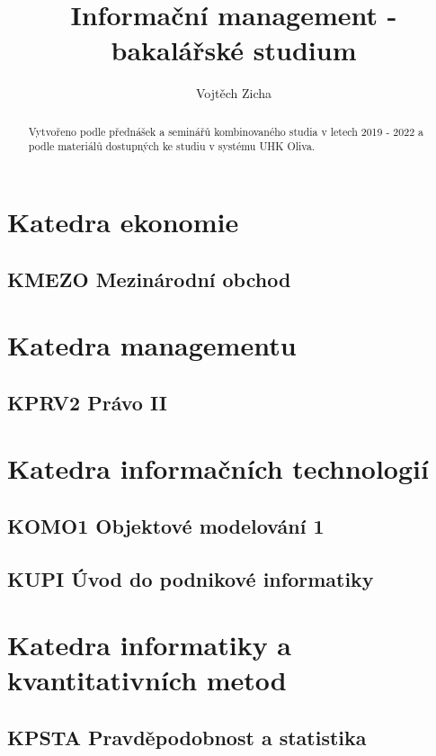 \documentclass[twoside,12pt]{report}
\title{Informační management - bakalářské studium}
\author{Vojtěch Zicha}
\begin{document}
\maketitle%

\begin{abstract}
Vytvořeno podle přednášek a seminářů kombinovaného studia v letech 2019 - 2022 a podle materiálů dostupných ke studiu v systému UHK Oliva.
\end{abstract}

\tableofcontents
\clearpage

\part{Katedra ekonomie}
\chapter{KMEZO Mezinárodní obchod}


\part{Katedra managementu}
\chapter{KPRV2 Právo II}


\part{Katedra informačních technologií}
\chapter{KOMO1 Objektové modelování 1}


\chapter{KUPI Úvod do podnikové informatiky}


\part{Katedra informatiky a kvantitativních metod}
\chapter{KPSTA Pravděpodobnost a statistika}

\end{document}
